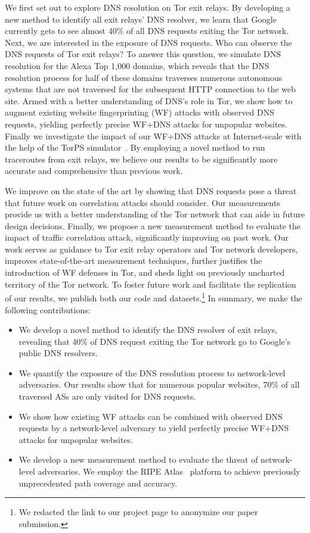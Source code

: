 We first set out to explore DNS resolution on Tor exit relays.  By developing a
new method to identify all exit relays' DNS resolver, we learn that Google
currently gets to see almost 40\% of all DNS requests exiting the Tor network.
Next, we are interested in the exposure of DNS requests.  Who can observe the
DNS requests of Tor exit relays?  To answer this question, we simulate DNS
resolution for the Alexa Top 1,000 domains, which reveals that the DNS
resolution process for half of these domains traverses numerous autonomous
systems that are not traversed for the subsequent HTTP connection to the web
site.  Armed with a better understanding of DNS's role in Tor, we show how to
augment existing website fingerprinting (WF) attacks with observed DNS requests,
yielding perfectly precise WF+DNS attacks for unpopular websites.
Finally we investigate the impact of our WF+DNS attacks at Internet-scale
with the help of the TorPS simulator~\cite{TorPS}.
By employing a novel method to run traceroutes from
exit relays, we believe our results to be significantly more accurate and
comprehensive than previous work.

We improve on the state of the art by showing that DNS requests pose a threat
that future work on correlation attacks should consider.  Our measurements
provide us with a better understanding of the Tor network that can aide in
future design decisions.  Finally, we propose a new measurement method to
evaluate the impact of traffic correlation attack, significantly improving on
past work.  Our work \first serves as guidance to Tor exit relay operators
and Tor network developers,
\second improves state-of-the-art measurement techniques, \third further
justifies the introduction of WF defenses in Tor, \fourth
and sheds light on previously uncharted territory of the Tor network.  To
foster future work and facilitate the replication of our results, we publish
both our code and datasets.\footnote{We redacted the link to our project page to
anonymize our paper submission.} In summary, we make the following
contributions:
\begin{itemize}
	\item We develop a novel method to identify the DNS resolver of exit relays,
		revealing that 40\% of DNS request exiting the Tor network go to
		Google's public DNS resolvers.

	\item We quantify the exposure of the DNS resolution process to
		network-level adversaries.  Our results show that for numerous popular
		websites, 70\% of all traversed ASs are only visited for DNS requests.

	\item We show how existing WF attacks can be combined with observed DNS
	requests by a network-level adversary to yield perfectly precise
	WF+DNS attacks for unpopular websites.

	\item We develop a new measurement method to evaluate the threat of
		network-level adversaries. We employ the RIPE Atlas~\cite{atlas}
		platform to achieve previously unprecedented path coverage and accuracy.
\end{itemize}

